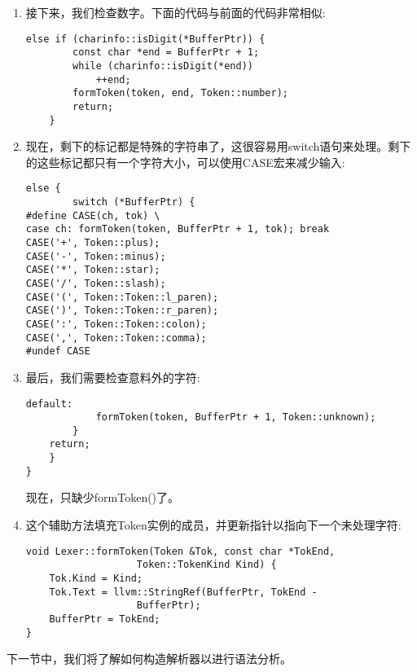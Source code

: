 \begin{enumerate}
\item 接下来，我们检查数字。下面的代码与前面的代码非常相似:
\begin{lstlisting}[caption={}]
	else if (charinfo::isDigit(*BufferPtr)) {
		const char *end = BufferPtr + 1;
		while (charinfo::isDigit(*end))
			++end;
		formToken(token, end, Token::number);
		return;
	}
\end{lstlisting}

\item 现在，剩下的标记都是特殊的字符串了，这很容易用switch语句来处理。剩下的这些标记都只有一个字符大小，可以使用CASE宏来减少输入:
\begin{lstlisting}[caption={}]
	else {
		switch (*BufferPtr) {
#define CASE(ch, tok) \
case ch: formToken(token, BufferPtr + 1, tok); break
CASE('+', Token::plus);
CASE('-', Token::minus);
CASE('*', Token::star);
CASE('/', Token::slash);
CASE('(', Token::Token::l_paren);
CASE(')', Token::Token::r_paren);
CASE(':', Token::Token::colon);
CASE(',', Token::Token::comma);
#undef CASE
\end{lstlisting}

\item 最后，我们需要检查意料外的字符:
\begin{lstlisting}[caption={}]
		default:
			formToken(token, BufferPtr + 1, Token::unknown);
		}
	return;
	}
}
\end{lstlisting}
现在，只缺少formToken()了。

\item 这个辅助方法填充Token实例的成员，并更新指针以指向下一个未处理字符:
\begin{lstlisting}[caption={}]
void Lexer::formToken(Token &Tok, const char *TokEnd,
                   Token::TokenKind Kind) {
	Tok.Kind = Kind;
	Tok.Text = llvm::StringRef(BufferPtr, TokEnd -
				   BufferPtr);
	BufferPtr = TokEnd;
}
\end{lstlisting}
\end{enumerate}

下一节中，我们将了解如何构造解析器以进行语法分析。\par





































